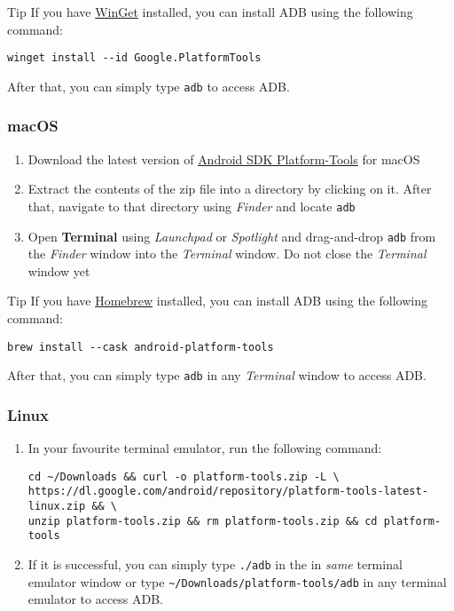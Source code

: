 \begin{tip}{Tip}
    If you have \href{https://learn.microsoft.com/en-us/windows/package-manager/winget/}{WinGet}
    installed, you can install ADB using the following command:
    \begin{verbatim}
winget install --id Google.PlatformTools
    \end{verbatim}
    After that, you can simply type \texttt{adb} to access ADB\@.
\end{tip}

\subsubsection{macOS} %
\begin{enumerate}
    \item Download the latest version of
    \href{https://dl.google.com/android/repository/platform-tools-latest-darwin.zip}{Android SDK Platform-Tools} for
    macOS
    \item Extract the contents of the zip file into a directory by clicking on it. After that, navigate to that
    directory using \textit{Finder} and locate \texttt{adb}
    \item Open \textbf{Terminal} using \textit{Launchpad} or \textit{Spotlight} and drag-and-drop \texttt{adb} from the
    \textit{Finder} window into the \textit{Terminal} window. Do not close the \textit{Terminal} window yet
\end{enumerate}

\begin{tip}{Tip}
    If you have \href{https://brew.sh}{Homebrew} installed, you can install ADB using the following
    command:
    \begin{verbatim}
brew install --cask android-platform-tools
    \end{verbatim}
    After that, you can simply type \texttt{adb} in any \textit{Terminal} window to access ADB\@.
\end{tip}

\subsubsection{Linux} %
\begin{enumerate}
    \item In your favourite terminal emulator, run the following command:
    \begin{verbatim}
cd ~/Downloads && curl -o platform-tools.zip -L \
https://dl.google.com/android/repository/platform-tools-latest-linux.zip && \
unzip platform-tools.zip && rm platform-tools.zip && cd platform-tools
    \end{verbatim}
    \item If it is successful, you can simply type \texttt{./adb} in the in \textit{same} terminal emulator window or
    type \texttt{\textasciitilde/Downloads/platform-tools/adb} in any terminal emulator to access ADB\@.
\end{enumerate}

